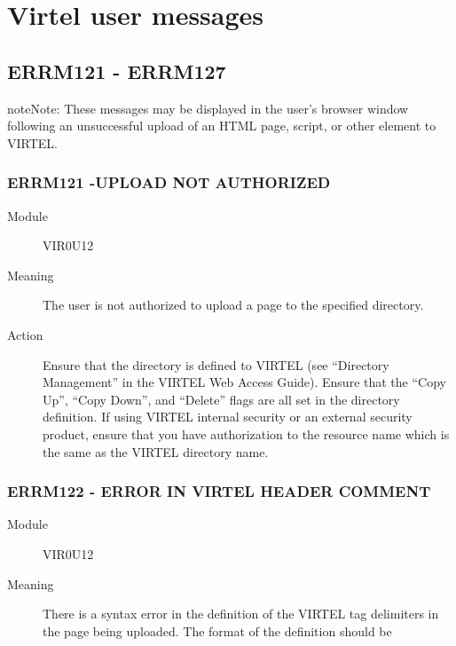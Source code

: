 \documentclass[letterpaper,10pt,english]{sphinxmanual}
\begin{document}
\section{Virtel user messages}
\label{\detokenize{messages:virtel-user-messages}}

\subsection{ERRM121 - ERRM127}
\label{\detokenize{messages:errm121-errm127}}
\begin{sphinxadmonition}{note}{Note:}
These messages may be displayed in the user’s browser window following an unsuccessful upload of an HTML page, script, or other element to VIRTEL.
\end{sphinxadmonition}


\subsubsection{ERRM121 -UPLOAD NOT AUTHORIZED}
\label{\detokenize{messages:errm121-upload-not-authorized}}\begin{description}
\item[{Module}] \leavevmode
VIR0U12

\item[{Meaning}] \leavevmode
The user is not authorized to upload a page to the specified directory.

\item[{Action}] \leavevmode
Ensure that the directory is defined to VIRTEL (see “Directory Management” in the VIRTEL Web Access Guide). Ensure that the “Copy Up”, “Copy Down”, and “Delete” flags are all set in the directory definition. If using VIRTEL internal security or an external security product, ensure that you have authorization to the resource name which is the same as the VIRTEL directory name.

\end{description}


\subsubsection{ERRM122 - ERROR IN VIRTEL HEADER COMMENT}
\label{\detokenize{messages:errm122-error-in-virtel-header-comment}}\begin{description}
\item[{Module}] \leavevmode
VIR0U12

\item[{Meaning}] \leavevmode
There is a syntax error in the definition of the VIRTEL tag delimiters in the page being uploaded. The format of the definition should be

\end{description}
\end{document}
